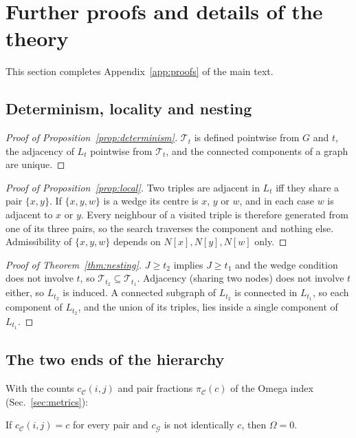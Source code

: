 \section{Further proofs and details of the theory}
\label{app:proofsmore}

This section completes Appendix~\ref{app:proofs} of the main text.

\subsection{Determinism, locality and nesting}

\begin{proof}[Proof of Proposition~\ref{prop:determinism}]
$\mathcal T_t$ is defined pointwise from $G$ and $t$, the adjacency of $L_t$ pointwise
from $\mathcal T_t$, and the connected components of a graph are unique.
\end{proof}

\begin{proof}[Proof of Proposition~\ref{prop:local}]
Two triples are adjacent in $L_t$ iff they share a pair $\{x,y\}$. If $\{x,y,w\}$ is a
wedge its centre is $x$, $y$ or $w$, and in each case $w$ is adjacent to $x$ or $y$.
Every neighbour of a visited triple is therefore generated from one of its three pairs,
so the search traverses the component and nothing else. Admissibility of
$\{x,y,w\}$ depends on $N[x],N[y],N[w]$ only.
\end{proof}

\begin{proof}[Proof of Theorem~\ref{thm:nesting}]
$J\ge t_2$ implies $J\ge t_1$ and the wedge condition does not involve $t$, so
$\mathcal T_{t_2}\subseteq\mathcal T_{t_1}$. Adjacency (sharing two nodes) does not
involve $t$ either, so $L_{t_2}$ is induced. A connected subgraph of $L_{t_2}$ is
connected in $L_{t_1}$, so each component of $L_{t_2}$, and the union of its triples,
lies inside a single component of $L_{t_1}$.
\end{proof}


\subsection{The two ends of the hierarchy}

With the counts $c_{\mathcal C}(i,j)$ and pair fractions $\pi_{\mathcal C}(c)$ of the
Omega index (Sec.~\ref{sec:metrics}):

\begin{lemma}
\label{lem:constant}
If $c_{\mathcal C}(i,j)=c$ for every pair and $c_{\mathcal G}$ is not identically $c$,
then $\Omega=0$.
\end{lemma}

